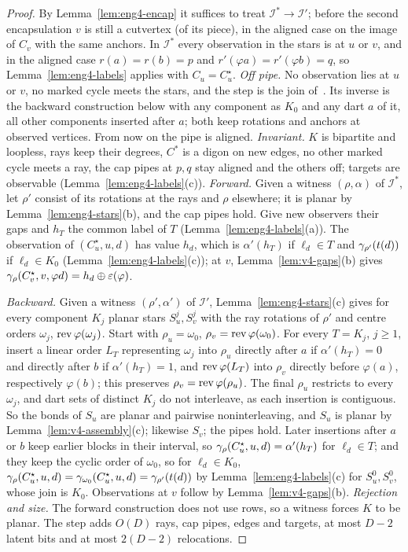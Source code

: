 \begin{proof}
By Lemma~\ref{lem:eng4-encap} it suffices to treat $\mathcal
I^\ast\to\mathcal I'$; before the second encapsulation $v$ is still a
cutvertex (of its piece), in the aligned case on the image of $C_v$ with
the same anchors. In
$\mathcal I^\ast$ every observation in the stars is at $u$ or $v$, and in the
aligned case $r(a)=r(b)=p$ and $r'(\varphi a)=r'(\varphi b)=q$, so
Lemma~\ref{lem:eng4-labels} applies with $C_u=C^\star_u$.
\emph{Off pipe.} No observation lies at $u$ or $v$, no marked cycle meets
the stars, and the step is the join of~\cite{BFR21}. Its inverse is the
backward construction below with any component as $K_0$ and any dart $a$ of
it, all other components inserted after $a$; both keep rotations and
anchors at observed vertices. From now on the pipe is aligned.
\emph{Invariant.} $K$ is bipartite and loopless, rays keep their degrees,
$C^\ast$ is a digon on new edges, no other marked cycle meets a ray, the cap
pipes at $p,q$ stay aligned and the others off; targets are observable
(Lemma~\ref{lem:eng4-labels}(c)).
\emph{Forward.} Given a witness $(\rho,\alpha)$ of $\mathcal I^\ast$, let
$\rho'$ consist of its rotations at the rays and $\rho$ elsewhere; it is
planar by Lemma~\ref{lem:eng4-stars}(b), and the cap pipes hold. Give new
observers their gaps and $h_T$ the common label of $T$
(Lemma~\ref{lem:eng4-labels}(a)). The observation of $(C^\star_u,u,d)$ has
value $h_d$, which is $\alpha'(h_T)$ if $\ell_d\in T$ and
$\gamma_{\rho'}(t(d))$ if $\ell_d\in K_0$ (Lemma~\ref{lem:eng4-labels}(c)); at
$v$, Lemma~\ref{lem:v4-gaps}(b) gives
$\gamma_\rho(C^\star_v,v,\varphi d)=h_d\oplus\varepsilon(\varphi)$.

\emph{Backward.} Given a witness $(\rho',\alpha')$ of $\mathcal I'$,
Lemma~\ref{lem:eng4-stars}(c) gives for every component $K_j$ planar stars
$S^j_u,S^j_v$ with the ray rotations of $\rho'$ and centre orders $\omega_j$,
$\operatorname{rev}\varphi(\omega_j)$. Start with $\rho_u=\omega_0$,
$\rho_v=\operatorname{rev}\varphi(\omega_0)$. For every $T=K_j$, $j\ge1$, insert a linear
order $L_T$ representing $\omega_j$ into $\rho_u$ directly after $a$ if
$\alpha'(h_T)=0$ and directly after $b$ if $\alpha'(h_T)=1$, and
$\operatorname{rev}\varphi(L_T)$ into $\rho_v$ directly before $\varphi(a)$, respectively
$\varphi(b)$; this preserves $\rho_v=\operatorname{rev}\varphi(\rho_u)$. The final
$\rho_u$ restricts to every $\omega_j$, and dart sets of distinct $K_j$ do
not interleave, as each insertion is contiguous. So the bonds of $S_u$ are
planar and pairwise noninterleaving, and $S_u$ is planar by
Lemma~\ref{lem:v4-assembly}(c); likewise $S_v$; the pipes hold. Later
insertions after $a$ or $b$ keep earlier blocks in their interval, so
$\gamma_\rho(C^\star_u,u,d)=\alpha'(h_T)$ for $\ell_d\in T$; and they keep
the cyclic order of $\omega_0$, so for $\ell_d\in K_0$,
$\gamma_\rho(C^\star_u,u,d)=\gamma_{\omega_0}(C^\star_u,u,d)=\gamma_{\rho'}(t(d))$
by Lemma~\ref{lem:eng4-labels}(c) for $S^0_u,S^0_v$, whose join is $K_0$.
Observations at $v$ follow by Lemma~\ref{lem:v4-gaps}(b).
\emph{Rejection and size.} The forward construction does not use rows, so a
witness forces $K$ to be planar. The step adds $O(D)$ rays, cap pipes, edges
and targets, at most $D-2$ latent bits and at most $2(D-2)$ relocations.
\end{proof}

